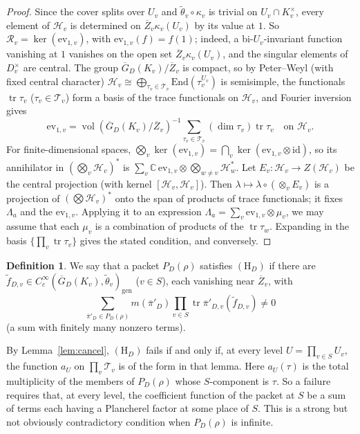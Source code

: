\documentclass[12pt]{article}
\newcommand{\ov}[1]{\overline{#1}}
\newcommand{\C}{\mathbb{C}}
\newcommand{\gen}{\mathrm{gen}}
\newcommand{\tr}{\operatorname{tr}}
\newcommand{\vol}{\operatorname{vol}}
\newcommand{\Zb}{\ov{Z}}
\newcommand{\GDb}{\ov{G}_D}
\newcommand{\pib}{\ov{\pi}}
\theoremstyle{plain}
\theoremstyle{definition}
\newtheorem{definition}[theorem]{Definition}
\begin{document}
\begin{proof}
Since the cover splits over $U_v$ and $\tilde\theta_v\circ\kappa_v$ is trivial on $U_v\cap K_v^\times$, every element of $\mathcal H_v$ is determined on $\Zb_v\kappa_v(U_v)$ by its value at $1$. So $\mathcal R_v=\ker(\mathrm{ev}_{1,v})$, with $\mathrm{ev}_{1,v}(f)=f(1)$; indeed, a bi-$U_v$-invariant function vanishing at $1$ vanishes on the open set $\Zb_v\kappa_v(U_v)$, and the singular elements of $D_v^\times$ are central. The group $\GDb(K_v)/\Zb_v$ is compact, so by Peter--Weyl (with fixed central character) $\mathcal H_v\cong\bigoplus_{\tau_v\in\mathcal T_v}\mathrm{End}(\tau_v^{U_v})$ is semisimple, the functionals $\tr\tau_v$ ($\tau_v\in\mathcal T_v$) form a basis of the trace functionals on $\mathcal H_v$, and Fourier inversion gives
\[ \mathrm{ev}_{1,v}=\vol(\GDb(K_v)/\Zb_v)^{-1}\sum_{\tau_v\in\mathcal T_v}(\dim\tau_v)\tr\tau_v\quad\text{on }\mathcal H_v. \]
For finite-dimensional spaces, $\bigotimes_v\ker(\mathrm{ev}_{1,v})=\bigcap_v\ker(\mathrm{ev}_{1,v}\otimes\mathrm{id})$, so its annihilator in $(\bigotimes_v\mathcal H_v)^*$ is $\sum_v\C\,\mathrm{ev}_{1,v}\otimes\bigotimes_{w\ne v}\mathcal H_w^*$. Let $E_v:\mathcal H_v\to Z(\mathcal H_v)$ be the central projection (with kernel $[\mathcal H_v,\mathcal H_v]$). Then $\lambda\mapsto\lambda\circ(\otimes_vE_v)$ is a projection of $(\bigotimes\mathcal H_v)^*$ onto the span of products of trace functionals; it fixes $\Lambda_a$ and the $\mathrm{ev}_{1,v}$. Applying it to an expression $\Lambda_a=\sum_v\mathrm{ev}_{1,v}\otimes\mu_v$, we may assume that each $\mu_v$ is a combination of products of the $\tr\tau_w$. Expanding in the basis $\{\prod_v\tr\tau_v\}$ gives the stated condition, and conversely.
\end{proof}

\begin{definition}\label{def:HD}
We say that a packet $P_D(\rho)$ satisfies $(\mathrm H_D)$ if there are $\tilde f_{D,v}\in C_c^\infty(\GDb(K_v),\tilde\theta_v)_\gen$ ($v\in S$), each vanishing near $\Zb_v$, with
\[ \sum_{\pib'_D\in P_D(\rho)}m(\pib'_D)\prod_{v\in S}\tr\pib'_{D,v}(\tilde f_{D,v})\neq0 \]
(a sum with finitely many nonzero terms).
\end{definition}

By Lemma~\ref{lem:cancel}, $(\mathrm H_D)$ fails if and only if, at every level $U=\prod_{v\in S}U_v$, the function $a_U$ on $\prod_v\mathcal T_v$ is of the form in that lemma. Here $a_U(\tau)$ is the total multiplicity of the members of $P_D(\rho)$ whose $S$-component is $\tau$. So a failure requires that, at every level, the coefficient function of the packet at $S$ be a sum of terms each having a Plancherel factor at some place of $S$. This is a strong but not obviously contradictory condition when $P_D(\rho)$ is infinite.
\end{document}
